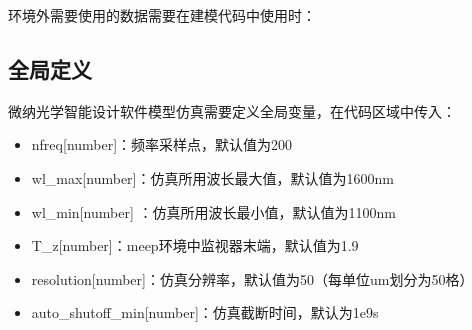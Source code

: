 \documentclass[letterpaper,10pt,english]{sphinxmanual}
\begin{document}
{{{{{{\begin{itemize}
\end{itemize}

\begin{sphinxVerbatim}[commandchars=\\\{\}]
\end{sphinxVerbatim}

\sphinxAtStartPar
环境外需要使用的数据需要在建模代码中使用时：

\begin{sphinxVerbatim}[commandchars=\\\{\}]
   
\end{sphinxVerbatim}


\subsection{全局定义}
\label{\detokenize{_u8f6f_u4ef6API_u63a5_u53e3/_u4eff_u771f/_u4eff_u771f:id3}}
\sphinxAtStartPar
微纳光学智能设计软件模型仿真需要定义全局变量，在代码区域中传入：
\begin{itemize}
\item {} 
\sphinxAtStartPar
nfreq{[}number{]}：频率采样点，默认值为200

\item {} 
\sphinxAtStartPar
wl\_max{[}number{]}：仿真所用波长最大值，默认值为1600nm

\item {} 
\sphinxAtStartPar
wl\_min{[}number{]} ：仿真所用波长最小值，默认值为1100nm

\item {} 
\sphinxAtStartPar
T\_z{[}number{]}：meep环境中监视器末端，默认值为1.9

\item {} 
\sphinxAtStartPar
resolution{[}number{]}：仿真分辨率，默认值为50（每单位um划分为50格）

\item {} 
\sphinxAtStartPar
auto\_shutoff\_min{[}number{]}：仿真截断时间，默认为1e\sphinxhyphen{}9s


\end{itemize}}}}}}}
\end{document}
